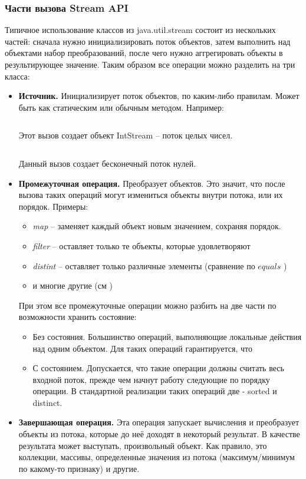 \subsubsection{Части вызова Stream API}
Типичное использование классов из java.util.stream состоит из нескольких частей: сначала 
нужно инициализировать поток объектов, затем выполнить над объектами набор преобразований, 
после чего нужно аггрегировать объекты в результирующее значение. Таким образом все операции 
можно разделить на три класса:
\begin{itemize}
	\item \textbf{Источник.} Инициализирует поток объектов, по каким-либо правилам. Может быть как 
	статическим или обычным методом. Например:
	\inputminted{java}{chapter1/code/IntStream.java}
	Этот вызов создает объект IntStream -- поток целых чисел.
	\inputminted{java}{chapter1/code/ZerosStream.java}
	Данный вызов создает бесконечный поток нулей.
	\item \textbf{Промежуточная операция.} Преобразует объектов. Это значит, что после вызова таких 
	операций могут измениться объекты внутри потока, или их порядок. Примеры:
	\begin{itemize}
		\item \textit{map} -- заменяет каждый объект новым значением, сохраняя порядок.
		\item \textit{filter} -- оставляет только те объекты, которые удовлетворяют 
		\item \textit{distint} -- оставляет только различные элементы (сравнение по $equals$ \cite{java:equals})
		\item и многие другие (см \cite{java:stream})
	\end{itemize}
	При этом все промежуточные операции можно разбить на две части по возможности хранить состояние:
	\begin{itemize}
		\item Без состояния. Большинство операций, выполняющие локальные действия над одним 
		объектом. Для таких операций гарантируется, что 
		\item С состоянием. Допускается, что такие операции должны считать весь входной 
		поток, прежде чем начнут работу следующие по порядку операции. В стандартной 
		реализации таких операций две - sorted и distinct.
	\end{itemize}
	\item \textbf{Завершающая операция.} Эта операция запускает вычисления и преобразует 
	объекты из потока, которые до неё доходят в некоторый результат. В качестве результата 
	может выступать, произвольный объект. Как правило, это коллекции, массивы, определенные 
	значения из потока (максимум/минимум по какому-то признаку) и другие.
\end{itemize}

